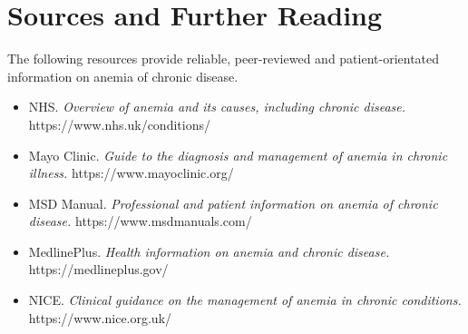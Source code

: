 \section*{Sources and Further Reading}
The following resources provide reliable, peer-reviewed and patient-orientated information on anemia of chronic disease.

\begin{itemize}
    \item NHS. \textit{Overview of anemia and its causes, including chronic disease.} https://www.nhs.uk/conditions/
    \item Mayo Clinic. \textit{Guide to the diagnosis and management of anemia in chronic illness.} https://www.mayoclinic.org/
    \item MSD Manual. \textit{Professional and patient information on anemia of chronic disease.} https://www.msdmanuals.com/
    \item MedlinePlus. \textit{Health information on anemia and chronic disease.} https://medlineplus.gov/
    \item NICE. \textit{Clinical guidance on the management of anemia in chronic conditions.} https://www.nice.org.uk/
\end{itemize}
